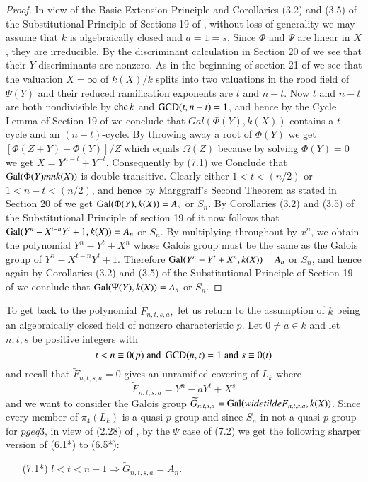 \noindent
\begin{proof} In view of the Basic Extension Principle and Corollaries (3.2) and (3.5) of the Substitutional Principle of Sections 19 of \cite{chap1-key8}, without loss of generality we may assume that $k$ is algebraically closed and $a=1 =s$. Since $\Phi$ and $\Psi$ are linear in $X$, they are irreducible. By the discriminant calculation in Section 20 of \cite{chap1-key8} we see that their $Y$-discriminants are nonzero. As in the beginning of section 21 of \cite{chap1-key8} we see that the valuation $X=\infty$ of $k(X)/k$ splits into two valuations in the rood field of $\Psi(Y)$ and their reduced  ramification exponents are $t$ and $n-t$. Now $t$ and $n-t$ are both nondivisible by $\operatorname{chc} k$ and $\operatorname{GCD}(t,n-t)=1$, and hence by the Cycle Lemma of Section 19 of \cite{chap1-key8} we conclude that $Gal(\Phi(Y), k(X))$ contains a $t$-cycle and an $(n-t)$-cycle. By throwing away a root of $\Phi(Y)$ we get $\left[\Phi(Z+Y)-\Phi(Y)\right]/Z$ which equals $\Omega(Z)$ because by solving $\Phi(Y)=0$ we get $X=Y^{n-t}+Y^{-t}$. Consequently by (7.1) we Conclude that $\operatorname{Gal}(\Phi(Y)mn k(X))$ is double transitive. Clearly either $1<t<(n/2)$ or $1<n-t<(n/2)$, and hence by Marggraff's Second Theorem as stated in Section 20 of \cite{chap1-key8} we get $\operatorname{Gal}(\Phi(Y), k(X)) = A_{n}$ or $S_{n}$. By Corollaries (3.2) and (3.5) of the Substitutional Principle of section 19 of \cite{chap1-key8} it now follows that $\operatorname{Gal}(Y^{n}-X^{t-n}Y^{t}+1, k(X))=A_{n}$ or $S_{n}$. By multiplying throughout by $x^{n}$, we obtain the polynomial $Y^{n}-Y^{t}+X^{n}$ whose Galois group must be the same as the Galois group of $Y^{n}-X^{t-n}Y^{t}+1$. Therefore $\operatorname{Gal}(Y^{n}-Y^{t}+X^{n}, k(X))=A_{n}$ or $S_{n}$, and hence again by Corollaries (3.2) and (3.5) of the Substitutional Principle of Section 19 of \cite{chap1-key8} we conclude that $\operatorname{Gal}(\Psi(Y), k(X)) =A_{n}$ or $S_{n}$.  
\end{proof}

To get back to the polynomial $\widetilde{F}_{n,t,s,a},$ let us return to the assumption of $k$ being an algebraically closed field of nonzero characteristic $p$. Let $0\neq a \in k$ and let $n, t, s$ be positive integers with
$$
t < n \equiv 0(p)\; {\rm and}\; \operatorname{GCD}(n,t) = 1\; {\rm and}\; s\equiv 0(t)
$$
and recall that $\widetilde{F}_{n,t,s,a} = 0$ gives an unramified covering of $L_{k}$ where
$$
\widetilde{F}_{n,t,s,a} =Y^{n}-aY^{t}+X^{s}
$$
and we want to consider the Galois group $\widetilde{G}_{n,t,s,a} = \Gal(widetilde{F}_{n,t,s,a},\break k(X))$. Since every member of $\pi_{4}(L_{k})$ is a quasi $p$-group and since $S_{n}$ in not a quasi $p$-group for $p geq 3$, in view of (2.28) of \cite{chap1-key14}, by the $\Psi$ case of (7.2) we get the following sharper version of (6.1*) to (6.5*):
\begin{itemize}
\item[{\rm (7.1*)}] $l < t < n-1 \Rightarrow \widetilde{G}_{n,t,s,a} =A_{n}$.
\end{itemize}

